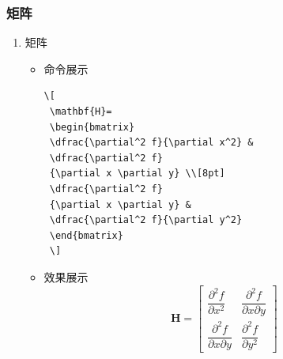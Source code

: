 \documentclass[UTF8]{ctexart}
\begin{document}
\subsubsection{矩阵}
\begin{enumerate}
  \item 矩阵
   \begin{itemize}
      \item 命令展示
\begin{lstlisting}
\[
 \mathbf{H}=
 \begin{bmatrix}
 \dfrac{\partial^2 f}{\partial x^2} &
 \dfrac{\partial^2 f}
 {\partial x \partial y} \\[8pt]
 \dfrac{\partial^2 f}
 {\partial x \partial y} &
 \dfrac{\partial^2 f}{\partial y^2}
 \end{bmatrix}
 \]
\end{lstlisting}
\item 效果展示
\[
 \mathbf{H}=
 \begin{bmatrix}
 \dfrac{\partial^2 f}{\partial x^2} &
 \dfrac{\partial^2 f}
 {\partial x \partial y} \\[8pt]
 \dfrac{\partial^2 f}
 {\partial x \partial y} &
 \dfrac{\partial^2 f}{\partial y^2}
 \end{bmatrix}
 \]
\end{itemize}
\end{enumerate}
\end{document}
